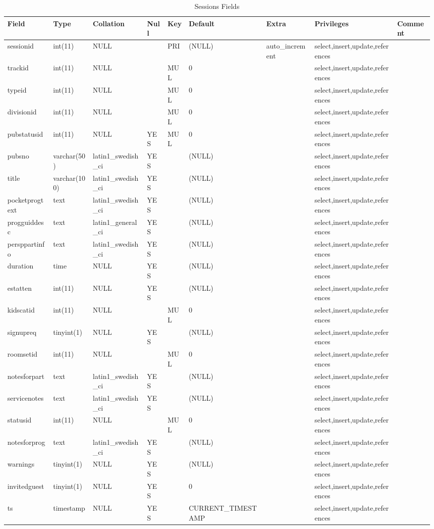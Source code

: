 \documentclass[captions=tablesignature]{scrartcl}
\begin{document}
\begin{table}[htb]
\caption{\label{tbl:sessionsfields}Sessions Fields}
\centering
\begin{tabular}{lllllllll}
\hline
Field & Type & Collation & Null & Key & Default & Extra & Privileges & Comment\\
\hline
sessionid & int(11) & NULL &  & PRI & (NULL) & auto\_increment & select,insert,update,references & \\
trackid & int(11) & NULL &  & MUL & 0 &  & select,insert,update,references & \\
typeid & int(11) & NULL &  & MUL & 0 &  & select,insert,update,references & \\
divisionid & int(11) & NULL &  & MUL & 0 &  & select,insert,update,references & \\
pubstatusid & int(11) & NULL & YES & MUL & 0 &  & select,insert,update,references & \\
pubsno & varchar(50) & latin1\_swedish\_ci & YES &  & (NULL) &  & select,insert,update,references & \\
title & varchar(100) & latin1\_swedish\_ci & YES &  & (NULL) &  & select,insert,update,references & \\
pocketprogtext & text & latin1\_swedish\_ci & YES &  & (NULL) &  & select,insert,update,references & \\
progguiddesc & text & latin1\_general\_ci & YES &  & (NULL) &  & select,insert,update,references & \\
persppartinfo & text & latin1\_swedish\_ci & YES &  & (NULL) &  & select,insert,update,references & \\
duration & time & NULL & YES &  & (NULL) &  & select,insert,update,references & \\
estatten & int(11) & NULL & YES &  & (NULL) &  & select,insert,update,references & \\
kidscatid & int(11) & NULL &  & MUL & 0 &  & select,insert,update,references & \\
signupreq & tinyint(1) & NULL & YES &  & (NULL) &  & select,insert,update,references & \\
roomsetid & int(11) & NULL &  & MUL & 0 &  & select,insert,update,references & \\
notesforpart & text & latin1\_swedish\_ci & YES &  & (NULL) &  & select,insert,update,references & \\
servicenotes & text & latin1\_swedish\_ci & YES &  & (NULL) &  & select,insert,update,references & \\
statusid & int(11) & NULL &  & MUL & 0 &  & select,insert,update,references & \\
notesforprog & text & latin1\_swedish\_ci & YES &  & (NULL) &  & select,insert,update,references & \\
warnings & tinyint(1) & NULL & YES &  & (NULL) &  & select,insert,update,references & \\
invitedguest & tinyint(1) & NULL & YES &  & 0 &  & select,insert,update,references & \\
ts & timestamp & NULL & YES &  & CURRENT\_TIMESTAMP &  & select,insert,update,references & \\
\hline
\end{tabular}
\end{table}
\end{document}

